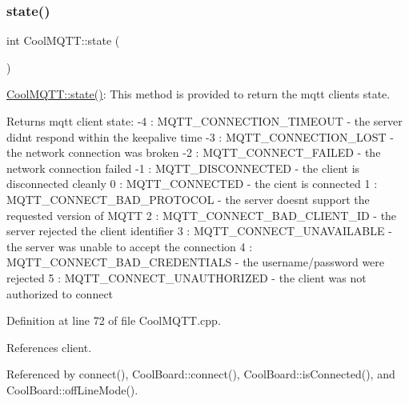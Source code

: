 \subsubsection{\texorpdfstring{state()}{state()}}
{\footnotesize\ttfamily int Cool\+M\+Q\+T\+T\+::state (\begin{DoxyParamCaption}{ }\end{DoxyParamCaption})}

\hyperlink{classCoolMQTT_a5d003307eff78efbd585e42b43b72b6d}{Cool\+M\+Q\+T\+T\+::state()}\+: This method is provided to return the mqtt client\textquotesingle{}s state. \begin{DoxyReturn}{Returns}
mqtt client state\+: -\/4 \+: M\+Q\+T\+T\+\_\+\+C\+O\+N\+N\+E\+C\+T\+I\+O\+N\+\_\+\+T\+I\+M\+E\+O\+UT -\/ the server didn\textquotesingle{}t respond within the keepalive time -\/3 \+: M\+Q\+T\+T\+\_\+\+C\+O\+N\+N\+E\+C\+T\+I\+O\+N\+\_\+\+L\+O\+ST -\/ the network connection was broken -\/2 \+: M\+Q\+T\+T\+\_\+\+C\+O\+N\+N\+E\+C\+T\+\_\+\+F\+A\+I\+L\+ED -\/ the network connection failed -\/1 \+: M\+Q\+T\+T\+\_\+\+D\+I\+S\+C\+O\+N\+N\+E\+C\+T\+ED -\/ the client is disconnected cleanly 0 \+: M\+Q\+T\+T\+\_\+\+C\+O\+N\+N\+E\+C\+T\+ED -\/ the cient is connected 1 \+: M\+Q\+T\+T\+\_\+\+C\+O\+N\+N\+E\+C\+T\+\_\+\+B\+A\+D\+\_\+\+P\+R\+O\+T\+O\+C\+OL -\/ the server doesn\textquotesingle{}t support the requested version of M\+Q\+TT 2 \+: M\+Q\+T\+T\+\_\+\+C\+O\+N\+N\+E\+C\+T\+\_\+\+B\+A\+D\+\_\+\+C\+L\+I\+E\+N\+T\+\_\+\+ID -\/ the server rejected the client identifier 3 \+: M\+Q\+T\+T\+\_\+\+C\+O\+N\+N\+E\+C\+T\+\_\+\+U\+N\+A\+V\+A\+I\+L\+A\+B\+LE -\/ the server was unable to accept the connection 4 \+: M\+Q\+T\+T\+\_\+\+C\+O\+N\+N\+E\+C\+T\+\_\+\+B\+A\+D\+\_\+\+C\+R\+E\+D\+E\+N\+T\+I\+A\+LS -\/ the username/password were rejected 5 \+: M\+Q\+T\+T\+\_\+\+C\+O\+N\+N\+E\+C\+T\+\_\+\+U\+N\+A\+U\+T\+H\+O\+R\+I\+Z\+ED -\/ the client was not authorized to connect 
\end{DoxyReturn}


Definition at line 72 of file Cool\+M\+Q\+T\+T.\+cpp.



References client.



Referenced by connect(), Cool\+Board\+::connect(), Cool\+Board\+::is\+Connected(), and Cool\+Board\+::off\+Line\+Mode().



